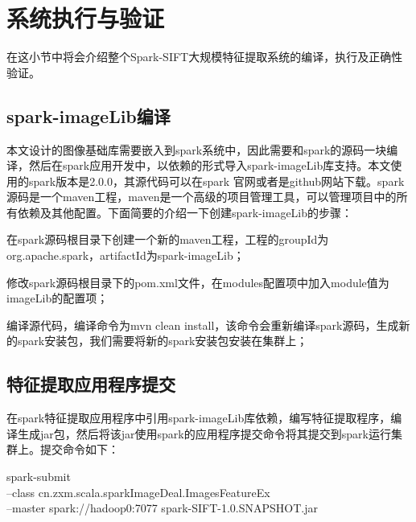 \section{系统执行与验证}
在这小节中将会介绍整个Spark-SIFT大规模特征提取系统的编译，执行及正确性验证。
\subsection{spark-imageLib编译}
本文设计的图像基础库需要嵌入到spark系统中，因此需要和spark的源码一块编译，然后在spark应用开发中，以依赖的形式导入spark-imageLib库支持。本文使用的spark版本是2.0.0，其源代码可以在spark 官网或者是github网站下载。spark源码是一个maven工程，maven是一个高级的项目管理工具，可以管理项目中的所有依赖及其他配置。下面简要的介绍一下创建spark-imageLib的步骤：
\begin{compactenum}
\item 在spark源码根目录下创建一个新的maven工程，工程的groupId为org.apache.spark，artifactId为spark-imageLib；
\item 修改spark源码根目录下的pom.xml文件，在modules配置项中加入module值为imageLib的配置项；
\item 编译源代码，编译命令为mvn clean install，该命令会重新编译spark源码，生成新的spark安装包，我们需要将新的spark安装包安装在集群上；
\end{compactenum}
\subsection{特征提取应用程序提交}
在spark特征提取应用程序中引用spark-imageLib库依赖，编写特征提取程序，编译生成jar包，然后将该jar使用spark的应用程序提交命令将其提交到spark运行集群上。提交命令如下：
\begin{code}
spark-submit
\\--class cn.zxm.scala.sparkImageDeal.ImagesFeatureEx
\\--master spark://hadoop0:7077
spark-SIFT-1.0.SNAPSHOT.jar
\end{code}
